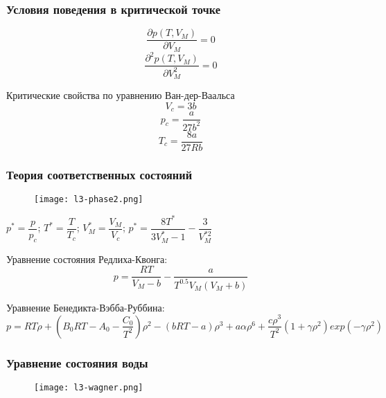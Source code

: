 \begin{frame}
\frametitle{Условия поведения в критической точке}
\begin{equation*}
	\dfrac{\partial  p(T,V_M)}{\partial V_M}=0
\end{equation*}
\begin{equation*}
\dfrac{\partial^2  p(T,V_M)}{\partial V_M^2}=0
\end{equation*}


Критические свойства по уравнению Ван-дер-Ваальса
\begin{equation*}
	V_c=3b
\end{equation*}
\begin{equation*}
	p_c = \dfrac{a}{27 b^2}
\end{equation*}
\begin{equation*}
	T_c=\dfrac{8 a}{27 R b}
\end{equation*}


\end{frame}

\begin{frame}
\frametitle{Теория соответственных состояний}
\begin{figure}[h]
	\texttt{[image: l3-phase2.png]}
\end{figure}
$p^*=\dfrac{p}{p_c}$;
$T^*=\dfrac{T}{T_c}$;
$V_M^*=\dfrac{V_M}{V_c}$;
$p^*=\dfrac{8T^*}{3V_M^*-1}-\dfrac{3}{V_M^{*2}}$


\end{frame}


\begin{frame}
Уравнение состояния Редлиха-Квонга:
\begin{equation}
p=\dfrac{RT}{V_M -b}-\dfrac{a}{T^{0.5} V_M (V_M+b)}
\end{equation}

Уравнение Бенедикта-Вэбба-Руббина:
\begin{equation}
	p= RT \rho + \left( B_0 RT - A_0 - \dfrac{C_0} {T^2} \right) \rho^2 - (b RT -a )\rho^3+a \alpha \rho^6 + 
	\dfrac { c \rho^3 }  {T^2} ( 1+\gamma \rho^2 ) exp ( - \gamma \rho^2 )
\end{equation}

\end{frame}

\begin{frame}
\frametitle{Уравнение состояния воды}
\begin{figure}[h]
	\texttt{[image: l3-wagner.png]}
\end{figure}

\end{frame}


